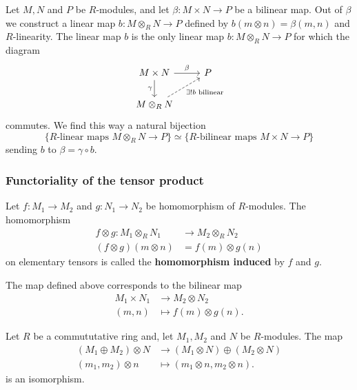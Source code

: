 \documentclass[12pt, a4paper]{article}
\begin{document}
\begin{mdnote}
    Let \( M, N \) and \( P \) be \( R \)-modules, and let \( \beta : M \times N \to P \) be a bilinear map. Out of \( \beta \) we construct a linear map \( b : M \otimes_R N \to P \) defined by \( b(m \otimes n) = \beta(m, n) \) and \( R \)-linearity. The linear map \( b \) is the only linear map \( b : M \otimes_R N \to P \) for which the diagram
    \[
\begin{tikzcd}
M \times N \arrow[r, "\beta"] \arrow[d, "\gamma"'] & P \\
M \otimes_R N \arrow[ru, "\exists! b \text{ bilinear}"', dashed] &
\end{tikzcd}
\]
commutes. We find this way a natural bijection
\[
\{ R\text{-linear maps } M \otimes_R N \to P \} \simeq \{ R\text{-bilinear maps } M \times N \to P \}
\]
sending \( b \) to \( \beta = \gamma \circ b \). 
\end{mdnote}

\subsubsection{Functoriality of the tensor product}

\begin{definition}
    Let \(f:M_1 \to M_2\) and \(g:N_1 \to N_2\) be homomorphism of \(R\)-modules. The homomorphism
    \[\begin{aligned}
        f\otimes g : M_1 \otimes_R N_1 &\to M_2 \otimes_R N_2 \\
        (f\otimes g)(m\otimes n)&= f(m)\otimes g(n)
    \end{aligned}\]
    on elementary tensors is called the \textbf{homomorphism induced} by \(f\) and \(g\). 
\end{definition}

\begin{theorem}
    The map defined above corresponds to the bilinear map 
    \[\begin{aligned}
        M_1 \times N_1 &\to M_2 \otimes N_2 \\
        (m,n) &\mapsto f(m) \otimes g(n).
    \end{aligned}\]
\end{theorem}

\begin{mdprop}
    Let \(R\) be a commututative ring and, let \(M_1,M_2\) and \(N\) be \(R\)-modules. The map
    \[\begin{aligned}
        (M_1\oplus M_2) \otimes N &\to (M_1 \otimes N)\oplus (M_2 \otimes N) \\
        (m_1,m_2) \otimes n &\mapsto (m_1\otimes n,m_2\otimes n).
    \end{aligned}\]
    is an isomorphism.
\end{mdprop}
\end{document}

